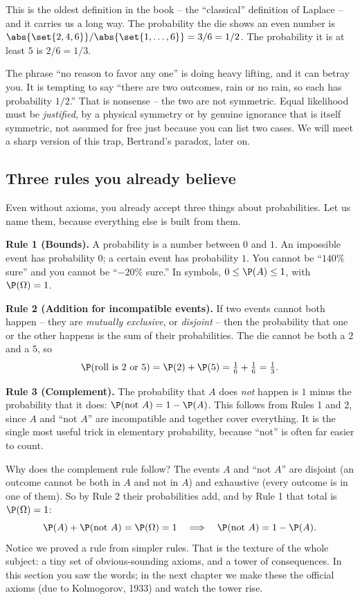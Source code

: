 This is the oldest definition in the book -- the ``classical'' definition of
Laplace -- and it carries us a long way. The probability the die shows an even
number is $\abs{\set{2,4,6}} / \abs{\set{1,\dots,6}} = 3/6 = 1/2$. The probability
it is at least $5$ is $2/6 = 1/3$.

\begin{trapbox}
The phrase ``no reason to favor any one'' is doing heavy lifting, and it can betray
you. It is tempting to say ``there are two outcomes, rain or no rain, so each has
probability $1/2$.'' That is nonsense -- the two are not symmetric. Equal
likelihood must be \emph{justified}, by a physical symmetry or by genuine
ignorance that is itself symmetric, not assumed for free just because you can list
two cases. We will meet a sharp version of this trap, Bertrand's paradox, later on.
\end{trapbox}

\subsection{Three rules you already believe}
\label{ch01:three-rules}

Even without axioms, you already accept three things about probabilities. Let us
name them, because everything else is built from them.

\textbf{Rule 1 (Bounds).} A probability is a number between $0$ and $1$. An
impossible event has probability $0$; a certain event has probability $1$. You
cannot be ``$140\%$ sure'' and you cannot be ``$-20\%$ sure.'' In symbols,
$0 \le \P(A) \le 1$, with $\P(\Omega) = 1$.

\textbf{Rule 2 (Addition for incompatible events).} If two events cannot both
happen -- they are \emph{mutually exclusive}, or \emph{disjoint} -- then the
probability that one or the other happens is the sum of their probabilities. The
die cannot be both a $2$ and a $5$, so
\[
  \P(\text{roll is } 2 \text{ or } 5) = \P(2) + \P(5) = \tfrac16 + \tfrac16 = \tfrac13.
\]

\textbf{Rule 3 (Complement).} The probability that $A$ does \emph{not} happen is
$1$ minus the probability that it does: $\P(\text{not } A) = 1 - \P(A)$. This
follows from Rules 1 and 2, since $A$ and ``not $A$'' are incompatible and together
cover everything. It is the single most useful trick in elementary probability,
because ``not'' is often far easier to count.

\begin{whybox}
Why does the complement rule follow? The events $A$ and ``not $A$'' are disjoint
(an outcome cannot be both in $A$ and not in $A$) and exhaustive (every outcome is
in one of them). So by Rule 2 their probabilities add, and by Rule 1 that total is
$\P(\Omega) = 1$:
\[
  \P(A) + \P(\text{not } A) = \P(\Omega) = 1
  \quad\Longrightarrow\quad
  \P(\text{not } A) = 1 - \P(A).
\]
Notice we proved a rule from simpler rules. That is the texture of the whole
subject: a tiny set of obvious-sounding axioms, and a tower of consequences. In
this section you saw the words; in the next chapter we make these the
official axioms (due to Kolmogorov, 1933) and watch the tower rise.
\end{whybox}


